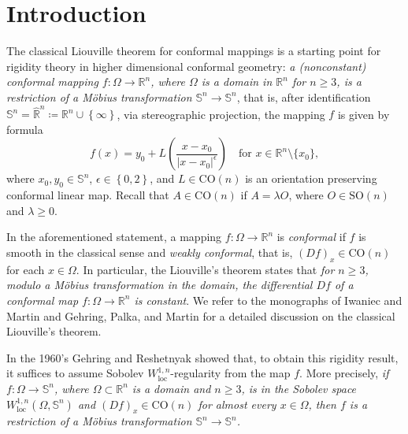 \documentclass[a4paper,leqno,11pt]{amsart}
\numberwithin{equation}{section}
\theoremstyle{remark}
\theoremstyle{remark}
\newcommand{\R}{\mathbb{R}}
\DeclareMathOperator{\loc}{loc}
\newcommand{\bS}{\mathbb{S}}
\newcommand{\SO}{\mathrm{SO}}
\newcommand{\CO}{\mathrm{CO}}
\begin{document}
\maketitle\thispagestyle{empty}


{
    \hypersetup{linkcolor=black}
    \setcounter{tocdepth}{1}
    \tableofcontents
}


\section{Introduction}\label{sec:intro}


The classical Liouville theorem for conformal mappings is a starting point for rigidity theory in higher dimensional conformal geometry: \emph{a (nonconstant) conformal mapping $f\colon \Omega \to \R^n$, where $\Omega$ is a domain in $\R^n$ for $n\ge 3$, is a restriction of a M\"obius transformation $\bS^n \to \bS^n$}, that is, after identification $\bS^{n}= \widehat{\R}^n \coloneqq \R^n \cup \left\{\infty\right\}$, via stereographic projection, the mapping $f$ is given by formula 
\begin{equation}\label{eq:Mobius}
    f(x) = y_0 + L\left( \frac{ x - x_0 }{ |x-x_0|^{\epsilon} } \right)
    \quad\text{for $x \in \R^n\setminus \{x_0\}$},
\end{equation}
where $x_0, y_0 \in \bS^n$, $\epsilon \in \left\{0,2\right\}$, and $L\in \CO(n)$ is an orientation preserving conformal linear map. Recall that $A \in \CO(n)$ if $A = \lambda O$, where $O \in \SO(n)$ and $\lambda \ge 0$.


In the aforementioned statement, a mapping $f\colon \Omega \to \R^n$ is \emph{conformal} if $f$ is smooth in the classical sense and \emph{weakly conformal}, that is, $(Df)_x \in \CO(n)$ for each $x\in \Omega$. In particular, the Liouville's theorem states that \emph{for $n\ge 3$, modulo a Möbius transformation in the domain, the differential $Df$ of a conformal map $f \colon \Omega \to \R^n$ is constant}. We refer to the monographs of Iwaniec and Martin \cite[Chapter 5]{Iw:Ma:01} and Gehring, Palka, and Martin \cite[Chapter 3]{Geh:Mar:Pal:17} for a detailed discussion on the classical Liouville's theorem. 




In the 1960's Gehring \cite{Geh:61} and Reshetnyak \cite{Res:60,Res:67} showed that, to obtain this rigidity result, it suffices to assume Sobolev $W^{1,n}_{\loc}$-regularity from the map $f$. More precisely, \emph{if $f\colon \Omega \to \bS^n$, where $\Omega \subset \R^n$ is a domain and $n\ge 3$, is in the Sobolev space $W^{1,n}_{\loc}(\Omega, \bS^n)$ and $(Df)_x \in \CO(n)$ for almost every $x\in \Omega$, then $f$ is a restriction of a M\"obius transformation $\bS^n \to \bS^n$.}
\end{document}
